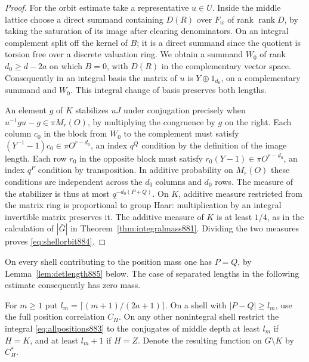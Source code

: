 \documentclass[a4paper,11pt]{article}
\theoremstyle{definition}
\theoremstyle{remark}
\numberwithin{equation}{section}
\begin{document}
\begin{proof}
For the orbit estimate take a representative \(u\in U\). Inside
the middle lattice choose a direct summand containing \(D(R)\)
over \(F_w\) of rank \(\operatorname{rank}D\), by taking the
saturation of its image after clearing denominators. On an
integral complement split off the kernel of \(B\); it is a
direct summand since the quotient is torsion free over a discrete
valuation ring. We obtain a summand \(W_0\) of rank \(d_0\ge d-2a\)
on which \(B=0\), with \(D(R)\) in the complementary vector
space. Consequently in an integral basis the matrix of \(u\)
is \(Y\oplus1_{d_0}\), on a complementary summand and \(W_0\).
This integral change of basis preserves both lengths.

An element \(g\) of \(K\) stabilizes \(uJ\) under conjugation
precisely when \(u^{-1}g u-g\in\pi M_r(O)\), by multiplying the
congruence by \(g\) on the right. Each column \(c_0\) in the
block from \(W_0\) to the complement must satisfy
\((Y^{-1}-1)c_0\in\pi O^{r-d_0}\), an index \(q^Q\) condition
by the definition of the image length. Each row \(r_0\) in the
opposite block must satisfy \(r_0(Y-1)\in\pi O^{r-d_0}\), an
index \(q^P\) condition by transposition. In additive probability
on \(M_r(O)\) these conditions are independent across the \(d_0\)
columns and \(d_0\) rows. The measure of the stabilizer is thus
at most \(q^{-d_0(P+Q)}\). On \(K\), additive measure restricted
from the matrix ring is proportional to group Haar: multiplication
by an integral invertible matrix preserves it. The additive
measure of \(K\) is at least \(1/4\), as in the calculation of
\(|\bar G|\) in Theorem~\ref{thm:integralmass881}.
Dividing the two measures proves \eqref{eq:shellorbit884}.
\end{proof}

On every shell contributing to the position mass one has \(P=Q\),
by Lemma~\ref{lem:detlength885} below. The case of separated
lengths in the following estimate consequently has zero mass.

For \(m\ge1\) put \(l_m=\lceil(m+1)/(2a+1)\rceil\). On a shell with
\(|P-Q|\ge l_m\), use the full position correlation \(C_H\). On any
other nonintegral shell restrict the integral \eqref{eq:allpositions883}
to the conjugates of middle depth at least \(l_m\) if \(H=K\),
and at least \(l_m+1\) if \(H=Z\). Denote the resulting function
on \(G\setminus K\) by \(C_H^{*}\).
\end{document}
